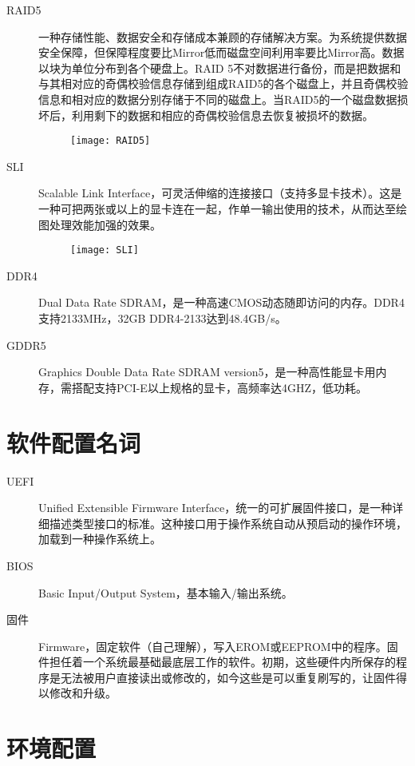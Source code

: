 \begin{description}
\item[RAID5] 一种存储性能、数据安全和存储成本兼顾的存储解决方案。为系统提供数据安全保障，但保障程度要比Mirror低而磁盘空间利用率要比Mirror高。数据以块为单位分布到各个硬盘上。RAID 5不对数据进行备份，而是把数据和与其相对应的奇偶校验信息存储到组成RAID5的各个磁盘上，并且奇偶校验信息和相对应的数据分别存储于不同的磁盘上。当RAID5的一个磁盘数据损坏后，利用剩下的数据和相应的奇偶校验信息去恢复被损坏的数据。
\begin{figure}[!ht]
\centering
\texttt{[image: RAID5]}
\end{figure}

\item[SLI] Scalable Link Interface，可灵活伸缩的连接接口（支持多显卡技术）。这是一种可把两张或以上的显卡连在一起，作单一输出使用的技术，从而达至绘图处理效能加强的效果。
\begin{figure}[!ht]
\centering
\texttt{[image: SLI]}
\end{figure}

\item[DDR4] Dual Data Rate SDRAM，是一种高速CMOS动态随即访问的内存。DDR4支持2133MHz，32GB DDR4-2133达到48.4GB/s。

\item[GDDR5] Graphics Double Data Rate SDRAM version5，是一种高性能显卡用内存，需搭配支持PCI-E以上规格的显卡，高频率达4GHZ，低功耗。
\end{description}

\section{软件配置名词}
\begin{description}
\item[UEFI] Unified Extensible Firmware Interface，统一的可扩展固件接口，是一种详细描述类型接口的标准。这种接口用于操作系统自动从预启动的操作环境，加载到一种操作系统上。
\item[BIOS] Basic Input/Output System，基本输入/输出系统。
\item[固件] Firmware，固定软件（自己理解），写入EROM或EEPROM中的程序。固件担任着一个系统最基础最底层工作的软件。初期，这些硬件内所保存的程序是无法被用户直接读出或修改的，如今这些是可以重复刷写的，让固件得以修改和升级。
\end{description}

\section{环境配置}
